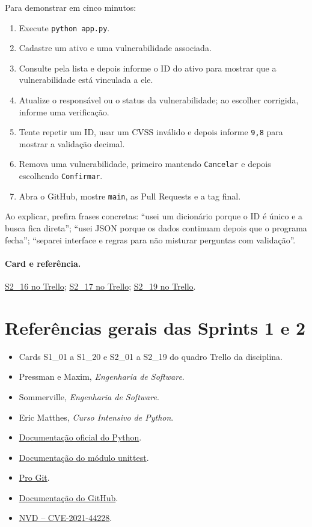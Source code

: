 \documentclass[11pt,a4paper]{article}
\newcommand{\referencia}[2]{\paragraph{Card e referência.}\href{#1}{#2}}
\begin{document}
Para demonstrar em cinco minutos:
\begin{enumerate}
  \item Execute \texttt{python app.py}.
  \item Cadastre um ativo e uma vulnerabilidade associada.
  \item Consulte pela lista e depois informe o ID do ativo para mostrar que a vulnerabilidade está vinculada a ele.
  \item Atualize o responsável ou o status da vulnerabilidade; ao escolher corrigida, informe uma verificação.
  \item Tente repetir um ID, usar um CVSS inválido e depois informe \texttt{9,8} para mostrar a validação decimal.
  \item Remova uma vulnerabilidade, primeiro mantendo \texttt{Cancelar} e depois escolhendo \texttt{Confirmar}.
  \item Abra o GitHub, mostre \texttt{main}, as Pull Requests e a tag final.
\end{enumerate}

Ao explicar, prefira frases concretas: ``usei um dicionário porque o ID é único e a busca fica direta''; ``usei JSON porque os dados continuam depois que o programa fecha''; ``separei interface e regras para não misturar perguntas com validação''.

\referencia{https://trello.com/c/UvtQ6Mc6}{S2\_16 no Trello}; \href{https://trello.com/c/FBSYXNJP}{S2\_17 no Trello}; \href{https://trello.com/c/ADSVtVQ4}{S2\_19 no Trello}.

\section{Referências gerais das Sprints 1 e 2}

\begin{itemize}
  \item Cards S1\_01 a S1\_20 e S2\_01 a S2\_19 do quadro Trello da disciplina.
  \item Pressman e Maxim, \emph{Engenharia de Software}.
  \item Sommerville, \emph{Engenharia de Software}.
  \item Eric Matthes, \emph{Curso Intensivo de Python}.
  \item \href{https://docs.python.org/3/}{Documentação oficial do Python}.
  \item \href{https://docs.python.org/3/library/unittest.html}{Documentação do módulo unittest}.
  \item \href{https://git-scm.com/book/pt-br/v2}{Pro Git}.
  \item \href{https://docs.github.com/}{Documentação do GitHub}.
  \item \href{https://nvd.nist.gov/vuln/detail/CVE-2021-44228}{NVD -- CVE-2021-44228}.
\end{itemize}
\end{document}
